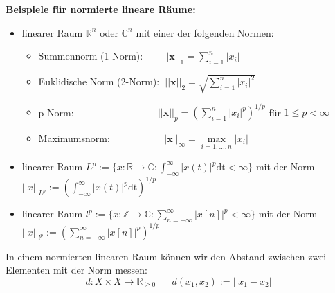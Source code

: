 \documentclass[11pt]{article}
\begin{document}
\textbf{Beispiele für normierte lineare Räume:}
\vspace*{-0.5cm}
\begin{itemize}
    \item linearer Raum $\mathbb{R}^n$ oder $\mathbb{C}^n$ mit einer der folgenden Normen: \begin{itemize}
        \item[] Summennorm (1-Norm): $\hspace{22pt}||\mathbf{x}||_1 = \sum_{i=1}^n |x_i|$
        \item[] Euklidische Norm (2-Norm): $\hspace{3pt}||\mathbf{x}||_2 = \sqrt{\sum_{i=1}^n |x_i|^2}$
        \item[] p-Norm: $\hspace{100pt}||\mathbf{x}||_p = \left(\sum_{i=1}^n |x_i|^p\right)^{1/p}$ für $1\leq p < \infty$
        \item[] Maximumsnorm: $\hspace{60pt}||\mathbf{x}||_\infty = \underset{i=1,\dots,n}{\max}|x_i|$
    \end{itemize}
    \item linearer Raum $L^p := \{ x:\mathbb{R}\to \mathbb{C} : \int_{-\infty}^\infty |x(t)|^p \text{dt} < \infty \} $ mit der Norm $||x||_{L^p} := \left( \int_{-\infty}^\infty |x(t)|^p \text{dt}\right)^{1/p}$
    \item linearer Raum $l^p :=\{ x:\mathbb{Z}\to \mathbb{C} : \sum_{n=-\infty}^\infty |x[n]|^p < \infty \} $ mit der Norm $||x||_{l^p} := \left( \sum_{n=-\infty}^\infty |x[n]|^p \right)^{1/p}$
\end{itemize}

In einem normierten linearen Raum können wir den Abstand zwischen zwei Elementen mit der Norm messen:
$$d:X\times X \to \mathbb{R}_{\geq 0} \hspace{20pt} d(x_1, x_2):= ||x_1 - x_2||$$

\vfill \null
\pagebreak

\end{document}
